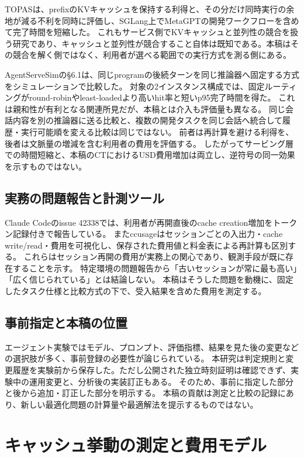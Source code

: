 \documentclass[a4paper,11pt]{article}
\begin{document}
TOPAS\cite{topas}は、prefixのKVキャッシュを保持する利得と、その分だけ同時実行の余地が減る不利を同時に評価し、SGLang上でMetaGPTの開発ワークフローを含めて完了時間を短縮した。
これもサービス側でKVキャッシュと並列性の競合を扱う研究であり、キャッシュと並列性が競合すること自体は既知である。本稿はその競合を解く側ではなく、利用者が選べる範囲での実行方式を測る側にある。

AgentServeSim\cite{agentservesim}の\S6.1は、同じprogramの後続ターンを同じ推論器へ固定する方式をシミュレーションで比較した。
対象の2インスタンス構成では、固定ルーティングがround-robinやleast-loadedより高いhit率と短いp95完了時間を得た。
これは親和性が有利となる関連所見だが、本稿とは介入も評価量も異なる。
同じ会話内容を別の推論器に送る比較と、複数の開発タスクを同じ会話へ統合して履歴・実行可能順を変える比較は同じではない。
前者は再計算を避ける利得を、後者は文脈量の増減を含む利用者の費用を評価する。
したがってサービング層での時間短縮と、本稿のCTにおけるUSD費用増加は両立し、逆符号の同一効果を示すものではない。

\subsection{実務の問題報告と計測ツール}
Claude Codeのissue 42338\cite{resumeissue}では、利用者が再開直後のcache creation増加をトークン記録付きで報告している。
またccusage\cite{ccusage}はセッションごとの入出力・cache write/read・費用を可視化し、保存された費用値と料金表による再計算も区別する\cite{ccusagecost}。
これらはセッション再開の費用が実務上の関心であり、観測手段が既に存在することを示す。
特定環境の問題報告から「古いセッションが常に最も高い」「広く信じられている」とは結論しない。
本稿はそうした問題を動機に、固定したタスク仕様と比較方式の下で、受入結果を含めた費用を測定する。

\subsection{事前指定と本稿の位置}
エージェント実験ではモデル、プロンプト、評価指標、結果を見た後の変更などの選択肢が多く、事前登録の必要性が論じられている\cite{prereg}。
本研究は判定規則と変更履歴を実験前から保存した。ただし公開された独立時刻証明は確認できず、実験中の運用変更と、分析後の実装訂正もある。
そのため、事前に指定した部分と後から追加・訂正した部分を明示する。
本稿の貢献は測定と比較の記録にあり、新しい最適化問題の計算量や最適解法を提示するものではない。

\section{キャッシュ挙動の測定と費用モデル}\label{sec:model}
\end{document}

